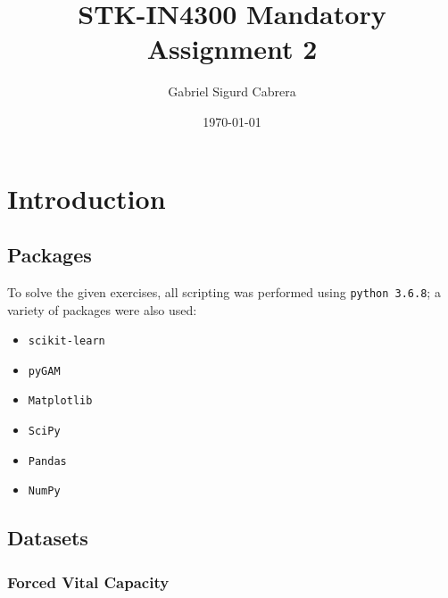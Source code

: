 \documentclass[twoside,twocolumn,10pt]{revtex4-1}
\begin{document}
	
	\title{STK-IN4300 Mandatory Assignment 2}
	\author{Gabriel Sigurd Cabrera}
	\date{\today}
	
	
	
	
	\fancyhf{} 
	\fancyhead[L]{\rightmark}
	\fancyfoot[C]{\thepage}
	
	\maketitle
	\twocolumngrid
	
	\section{Introduction}
	
	\subsection{Packages}
	
	To solve the given exercises, all scripting was performed using \texttt{python 3.6.8}; a variety of packages were also used:
	
	\begin{itemize}
	\item \texttt{scikit-learn} \cite{scikit-learn}
	\item \texttt{pyGAM} \cite{pygam}
	\item \texttt{Matplotlib} \cite{matplotlib}
	\item \texttt{SciPy} \cite{scipy}
	\item \texttt{Pandas} \cite{pandas}
	\item \texttt{NumPy} \cite{numpy}
	\end{itemize}
	
	\subsection{Datasets}
	
	\subsubsection{Forced Vital Capacity}
	
\end{document}
